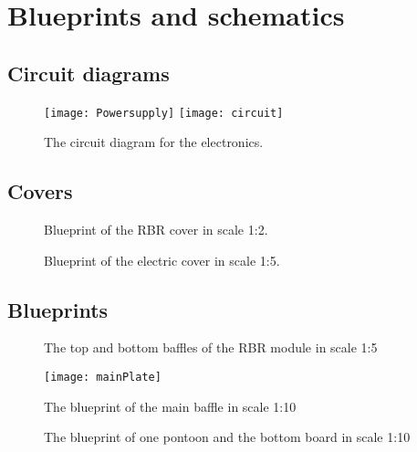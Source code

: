 \clearpage
\section{Blueprints and schematics}\label{sec:appendix-b}
\subsection{Circuit diagrams}
\begin{figure}[H]
  \centering
  \texttt{[image: Powersupply]}
  \texttt{[image: circuit]}
  \caption{The circuit diagram for the electronics.}
  \label{fig:appendix-circuit-diagrams}
\end{figure}

\clearpage
\subsection{Covers}
\begin{figure}[H]
  \centering
  \caption{Blueprint of the RBR cover in scale 1:2.}
  \label{fig:appendix-blueprint-rbr-cover}
\end{figure}

\begin{figure}[H]
  \centering
  \caption{Blueprint of the electric cover in scale 1:5.}
  \label{fig:appendix-blueprint-electronic-cover}
\end{figure}

\clearpage
\subsection{Blueprints}
\begin{figure}[H]
  \centering
  \caption{The top and bottom baffles of the RBR module in scale 1:5}
  \label{fig:appendix-blueprint-rbr-module}
\end{figure}

\begin{figure}[H]
    \centering
    \texttt{[image: mainPlate]}
    \caption{The blueprint of the main baffle in scale 1:10}
    \label{fig:appendix-blueprint-main-plate}
\end{figure}

\begin{figure}[H]
    \centering
    \caption{The blueprint of one pontoon and the bottom board in scale 1:10}
    \label{fig:appendix-blueprint-ponton}
\end{figure}

